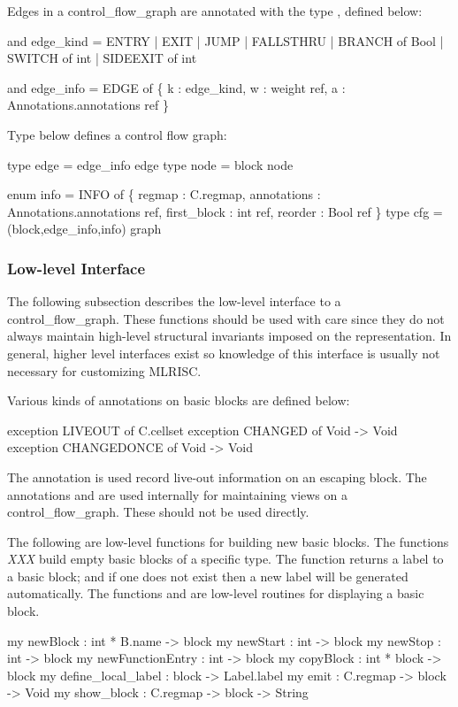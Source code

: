 Edges in a control_flow_graph are annotated with the type ,
defined below:
\begin{SML}
   and edge_kind = ENTRY           
                 | EXIT           
                 | JUMP          
                 | FALLSTHRU     
                 | BRANCH of Bool
                 | SWITCH of int 
                 | SIDEEXIT of int 

   and edge_info = 
       EDGE of \{ k : edge_kind,                 
                 w : weight ref,               
                 a : Annotations.annotations ref
               \}
\end{SML}

Type  below defines a control flow graph:
\begin{SML}
   type edge = edge_info edge
   type node = block node

   enum info = 
       INFO of \{ regmap     : C.regmap,
                 annotations : Annotations.annotations ref,
                 first_block : int ref,
                 reorder     : Bool ref
               \}
   type cfg = (block,edge_info,info) graph
\end{SML}

\subsubsection{Low-level Interface}
   The following subsection describes the low-level interface to a control_flow_graph.
These functions should be used with care since they do not
always maintain high-level structural invariants imposed on
the representation.  In general, higher level interfaces exist
so knowledge of this interface is usually not necessary for customizing
MLRISC. 
   
   Various kinds of annotations on basic blocks are defined below:
\begin{SML}
   exception LIVEOUT of C.cellset   
   exception CHANGED of Void -> Void
   exception CHANGEDONCE of Void -> Void
\end{SML}
The annotation  is used record live-out information
on an escaping block.
The annotations  and  are used
internally for maintaining views on a control_flow_graph.  These should not be used
directly. 

    The following are low-level functions for building new basic blocks.
The functions \emph{XXX} build empty basic blocks of a specific
type.  The function  returns a label to a basic block;
and if one does not exist then a new label will be generated automatically.
The functions  and  are low-level
routines for displaying a basic block.
\begin{SML}
   my newBlock          : int * B.name -> block      
   my newStart          : int -> block              
   my newStop           : int -> block             
   my newFunctionEntry  : int -> block            
   my copyBlock         : int * block -> block   
   my define_local_label       : block -> Label.label  
   my emit              : C.regmap -> block -> Void
   my show_block        : C.regmap -> block -> String 
\end{SML}

